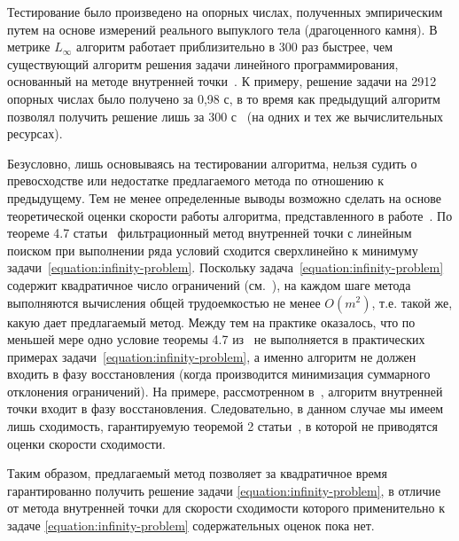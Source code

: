 \documentclass[a4paper, 11pt]{article}
\theoremstyle{MyDefinitionStyle}
\theoremstyle{MyTheoremStyle}
\begin{document}
Тестирование было произведено на опорных числах, полученных эмпирическим путем
на основе измерений реального выпуклого тела (драгоценного камня).
В метрике $L_{\infty}$ алгоритм работает приблизительно в 300
раз быстрее, чем существующий алгоритм решения задачи линейного программирования,
основанный на методе внутренней точки~\cite{Ipopt}. К примеру, решение задачи на
2912 опорных числах было получено за 0,98 с, в то время как
предыдущий алгоритм позволял получить решение лишь за 300 с~\cite{palachev}
(на одних и тех же вычислительных ресурсах).

Безусловно, лишь основываясь на тестировании алгоритма, нельзя судить о превосходстве
или недостатке предлагаемого метода по отношению к предыдущему. Тем не менее
определенные выводы возможно сделать на основе теоретической оценки скорости
работы алгоритма, представленного в работе~\cite{palachev}.
По теореме 4.7 статьи~\cite{WachterBiegler}
фильтрационный метод внутренней точки с линейным поиском при выполнении ряда
условий сходится сверхлинейно к минимуму
задачи~\eqref{equation:infinity-problem}. Поскольку
задача~\eqref{equation:infinity-problem}
содержит квадратичное число ограничений
(см.~\cite{GardnerKiderlen,palachev}), на каждом шаге метода выполняются
вычисления общей трудоемкостью не менее $O(m^2)$, т.е. такой же, какую дает
предлагаемый метод. Между тем на практике оказалось, что по меньшей мере одно
условие теоремы 4.7 из~\cite{WachterBiegler} не выполняется в практических
примерах задачи~\eqref{equation:infinity-problem}, а именно
алгоритм не должен входить в фазу восстановления (когда производится
минимизация суммарного отклонения ограничений). На примере, рассмотренном
в~\cite{palachev}, алгоритм внутренней точки входит в фазу восстановления.
Следовательно, в данном случае мы имеем лишь сходимость, гарантируемую теоремой
2 статьи~\cite{WachterBiegler2}, в которой не приводятся оценки скорости
сходимости.

Таким образом, предлагаемый метод позволяет за квадратичное время
гарантированно получить решение задачи \eqref{equation:infinity-problem},
в отличие от метода внутренней точки для
скорости сходимости которого применительно к задаче
\eqref{equation:infinity-problem} содержательных оценок пока нет.
\end{document}
